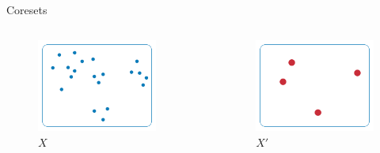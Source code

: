 \documentclass[
  ignorenonframetext,
]{beamer}
\begin{document}
\begin{frame}{Coresets}
\protect\hypertarget{coresets}{}
\begin{columns}[T]
\begin{column}{.4\textwidth}

\begin{figure}
\centering
\includegraphics[width=1\textwidth]{dataset.png}
\caption{$X$}
\end{figure}

\end{column}
\begin{column}{.1\textwidth}
\pause
\begin{center}
\vspace{1.5cm}
$\Rightarrow$
\end{center}
\end{column}

\begin{column}{.4\textwidth}
\begin{figure}
\centering
\includegraphics[width=1\textwidth]{coreset.png}
\caption{$X'$}
\end{figure}
\end{column}


\end{columns}
\end{frame}
\end{document}

